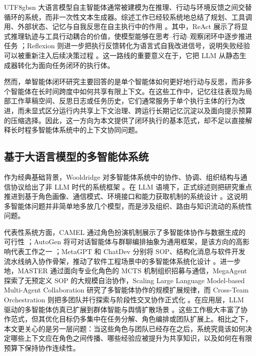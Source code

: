 \documentclass[a4paper,fleqn]{cas-sc}
\begin{document}
\begin{CJK*}{UTF8}{gbsn}
大语言模型自主智能体通常被建模为在推理、行动与环境反馈之间交替循环的系统，而非一次性文本生成器。综述工作已经较系统地总结了规划、工具调用、外部状态、记忆与自我反思在自主执行中的作用 \citep{wang2024survey}。其中，ReAct 展示了将显式推理轨迹与工具行动耦合的价值，使模型能够在思考--行动--观察闭环中逐步推进任务 \citep{yao2023react}；Reflexion 则进一步把执行反馈转化为语言式自我改进信号，说明失败经验可以被重新注入后续决策过程 \citep{shinn2023reflexion}。这一路线的重要意义在于，它把 LLM 从静态生成器转化为面向任务闭环的执行体。

然而，单智能体闭环研究主要回答的是单个智能体如何更好地行动与反思，而非多个智能体在长时间跨度中如何共享有限上下文。在这些工作中，记忆往往表现为局部工作草稿空间、反思日志或任务历史，它们通常服务于单个执行主体的行为改进，而未显式区分运行内共享上下文治理、跨运行长期记忆沉淀以及面向提示预算的压缩选择。因此，这一方向为本文提供了闭环执行的基本范式，却不足以直接解释长时程多智能体系统中的上下文协同问题。

\subsection{基于大语言模型的多智能体系统}

作为经典基础背景，Wooldridge 对多智能体系统中的协作、协调、组织结构与通信协议给出了非 LLM 时代的系统框架 \citep{wooldridge2009}。在 LLM 语境下，正式综述则把研究重点推进到基于角色画像、通信模式、环境接口和能力获取机制的系统设计 \citep{guo2024llmmas,li2024masworkflow}。这说明多智能体问题并非简单地多放几个模型，而是涉及组织、路由与知识流动的系统性问题。

代表性系统方面，CAMEL 通过角色扮演机制展示了多智能体协作与数据生成的可行性 \citep{li2023camel}；AutoGen 将可对话智能体与群聊编排抽象为通用框架，是该方向的高影响代表工作之一 \citep{wu2023autogen}；MetaGPT 和 ChatDev 分别将 SOP、结构化消息与软件开发流水线纳入协作骨架，推动了软件工程场景中的多智能体系统化设计 \citep{hong2024metagpt,qian2024chatdev}。进一步地，MASTER 通过面向专业化角色的 MCTS 机制组织招募与通信，MegaAgent 探索了无预定义 SOP 的大规模自治协作，Scaling Large Language Model-based Multi-Agent Collaboration 研究了多智能体协作的规模扩展规律，而 Cross-Team Orchestration 则把多团队并行探索与阶段性交叉协作正式化 \citep{gan2025master,wang2025megaagent,qian2025macnet,du2025crossteam}。在应用层，LLM 驱动的多智能体仿真已扩展到群体智能与舆情扩散场景 \citep{jimenezromero2025swarm,lan2026publicopinion}。这些工作极大丰富了协作范式，但其优化目标仍多集中在任务分解、角色编排或团队扩展上。相比之下，本文更关心的是另一层问题：当这些角色与团队已经存在之后，系统究竟该如何决定哪些上下文应在角色之间传播、哪些经验应被提升为共享知识，以及如何在有限预算下保持协作连续性。


\end{CJK*}
\end{document}
